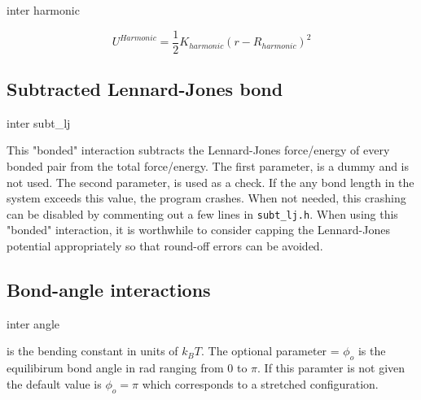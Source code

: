 \begin{essyntax}
  inter  
  harmonic
\end{essyntax}

\[ U^{Harmonic} = \frac{1}{2} K_{harmonic} \left( r - R_{harmonic} \right)^2 \] 

\subsection{Subtracted Lennard-Jones bond}

\begin{essyntax}
  inter  
  subt_lj
   
\end{essyntax}

This "bonded" interaction subtracts the Lennard-Jones force/energy of
every bonded pair from the total force/energy. The first parameter,
 is a dummy and is not used. The second parameter,
 is used as a check. If the any bond length in the
system exceeds this value, the program crashes. When not needed, this
crashing can be disabled by commenting out a few lines in
\texttt{subt_lj.h}.  When using this "bonded" interaction, it is
worthwhile to consider capping the Lennard-Jones potential
appropriately so that round-off errors can be avoided.

\subsection{Bond-angle interactions}

\begin{essyntax}
  inter  
  angle  
\end{essyntax}

 is the bending constant in units of $k_BT$. The optional
parameter  = $ \phi_o $ is the equilibirum bond angle in rad
ranging from 0 to $ \pi $. If this paramter is not given the default
value is $ \phi_o = \pi $ which corresponds to a stretched
configuration.


